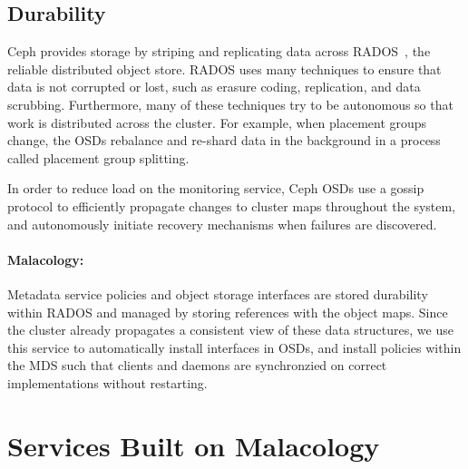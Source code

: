 \documentclass[10pt,twocolumn]{article}
\begin{document}

\subsection{Durability}
\label{sec:durability}

Ceph provides storage by striping and replicating data across
RADOS~\cite{weil_rados_2007}, the reliable distributed object store. RADOS
uses many techniques to ensure that data is not corrupted or lost, such as
erasure coding, replication, and data scrubbing. Furthermore, many of these
techniques try to be autonomous so that work is distributed across the
cluster. For example, when placement groups change, the OSDs rebalance and
re-shard data in the background in a process called placement group splitting.

In order to reduce load on the monitoring service, Ceph OSDs use a gossip
protocol to efficiently propagate changes to cluster maps throughout the
system, and autonomously initiate recovery mechanisms when failures are
discovered.

\paragraph*{Malacology:} Metadata service policies and object storage interfaces are stored durability
within RADOS and managed by storing references with the object maps. Since
the cluster already propagates a consistent view of these data structures,
we use this service to automatically install interfaces in OSDs, and install
policies within the MDS such that clients and daemons are synchronzied on
correct implementations without restarting.



\section{Services Built on Malacology}\label{services-built-on-malacology}

\label{services}
\end{document}

